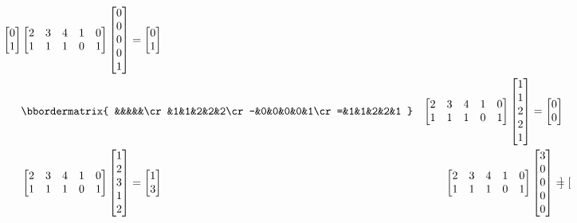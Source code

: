 \begin{enumerate}[label=\alph*)]
\begin{align*}
\begin{bmatrix}
0\\1
\end{bmatrix} &\begin{bmatrix}
2& 3& 4& 1& 0\\
1& 1& 1& 0& 1 
\end{bmatrix}\begin{bmatrix}
0\\ 0\\ 0\\ 0\\ 1
\end{bmatrix}=\begin{bmatrix}
0\\1
\end{bmatrix} \\
&\bbordermatrix{
&&&&&\cr
&1&1&2&2&2\cr
-&0&0&0&0&1\cr
=&1&1&2&2&1
}&\begin{bmatrix}
2& 3& 4& 1& 0\\
1& 1& 1& 0& 1 
\end{bmatrix}\begin{bmatrix}
1\\ 1\\ 2\\ 2\\ 1
\end{bmatrix}=\begin{bmatrix}
0\\0
\end{bmatrix}\\
&\begin{bmatrix}
2& 3& 4& 1& 0\\
1& 1& 1& 0& 1 
\end{bmatrix}\begin{bmatrix}
1\\ 2\\ 3\\ 1\\ 2
\end{bmatrix}=\begin{bmatrix}
1\\3
\end{bmatrix}&\begin{bmatrix}
2& 3& 4& 1& 0\\
1& 1& 1& 0& 1 
\end{bmatrix}\begin{bmatrix}
3\\ 0\\ 0\\ 0\\ 0
\end{bmatrix}=\begin{bmatrix}

\end{bmatrix}
\end{align*}
\end{enumerate}

